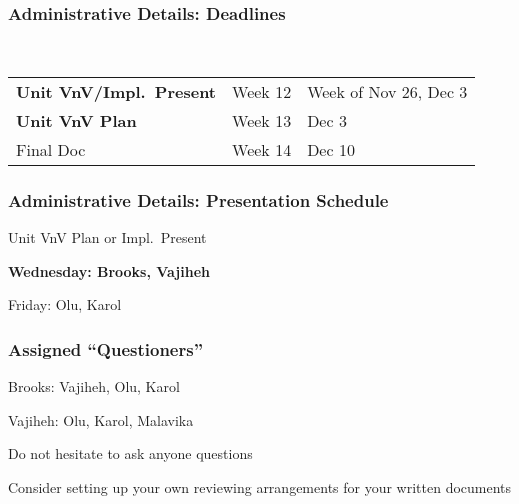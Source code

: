 \documentclass[t,12pt,numbers,fleqn]{beamer}
\begin{document}



\begin{frame}
\frametitle{Administrative Details: Deadlines}
~\newline
\begin{tabular}{l l l}
\textbf{Unit VnV/Impl.\ Present} & Week 12 & Week of Nov 26, Dec 3\\
\textbf{Unit VnV Plan} & Week 13 & Dec 3\\
Final Doc & Week 14 & Dec 10\\
\end {tabular}

\end{frame}


\begin{frame}
\frametitle{Administrative Details: Presentation Schedule}

\bi
\item Unit VnV Plan or Impl.\ Present
\bi
\item \textbf{Wednesday: Brooks, Vajiheh}
\item Friday: Olu, Karol
\ei
\ei

\end{frame}


\begin{frame}
\frametitle{Assigned ``Questioners''}

\be
\item Brooks: Vajiheh, Olu, Karol
\item Vajiheh: Olu, Karol, Malavika
\ee
\bi
\item Do not hesitate to ask anyone questions
\item Consider setting up your own reviewing arrangements for your written
  documents
\ei
\end{frame}

\end{document}
